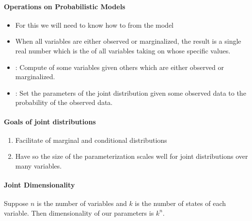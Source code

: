 \documentclass[11pt]{article}
\begin{document}
\paragraph{Operations on Probabilistic Models}
\begin{itemize}
	\item {} For this we will need to know how to  from the model
	\item {} When all variables are either observed or marginalized, the result is a single real number which is the  of all variables taking on whose specific values.
	\item {}: Compute  of some variables given others which are either observed or marginalized.
	\item {}: Set the parameters of the joint distribution given some observed data to  the probability of the observed data.
\end{itemize}

\paragraph{Goals of joint distributions}
\begin{enumerate}
	\item Facilitate  of marginal and conditional distributions
	\item Have  so the size of the parameterization scales well for joint distributions over many variables.
\end{enumerate}

\paragraph{Joint Dimensionality}
Suppose $n$ is the number of variables and $k$ is the number of states of each variable. Then  dimensionality of our parameters is $k^n$.
\end{document}
